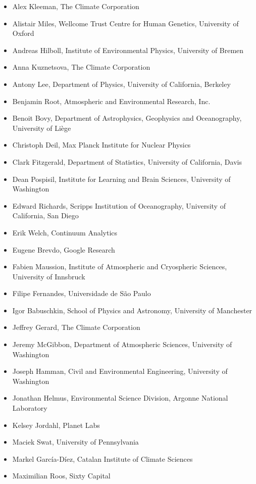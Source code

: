 \documentclass{jors}
\begin{document}
\begin{itemize}
\item Alex Kleeman, The Climate Corporation
\item Alistair Miles, Wellcome Trust Centre for Human Genetics, University of Oxford
\item Andreas Hilboll, Institute of Environmental Physics, University of Bremen
\item Anna Kuznetsova, The Climate Corporation
\item Antony Lee, Department of Physics, University of California, Berkeley
\item Benjamin Root, Atmospheric and Environmental Research, Inc.
\item Benoit Bovy, Department of Astrophysics, Geophysics and Oceanography, University of Liège
\item Christoph Deil, Max Planck Institute for Nuclear Physics
\item Clark Fitzgerald, Department of Statistics, University of California, Davis
\item Dean Pospisil, Institute for Learning and Brain Sciences, University of Washington
\item Edward Richards, Scripps Institution of Oceanography, University of California, San Diego
\item Erik Welch, Continuum Analytics
\item Eugene Brevdo, Google Research
\item Fabien Maussion, Institute of Atmospheric and Cryospheric Sciences, University of Innsbruck
\item Filipe Fernandes, Universidade de São Paulo
\item Igor Babuschkin, School of Physics and Astronomy, University of Manchester
\item Jeffrey Gerard, The Climate Corporation
\item Jeremy McGibbon, Department of Atmospheric Sciences, University of Washington
\item Joseph Hamman, Civil and Environmental Engineering, University of Washington
\item Jonathan Helmus, Environmental Science Division, Argonne National Laboratory
\item Kelsey Jordahl, Planet Labs
\item Maciek Swat, University of Pennsylvania
\item Markel García-Díez, Catalan Institute of Climate Sciences
\item Maximilian Roos, Sixty Capital

\end{itemize}
\end{document}
